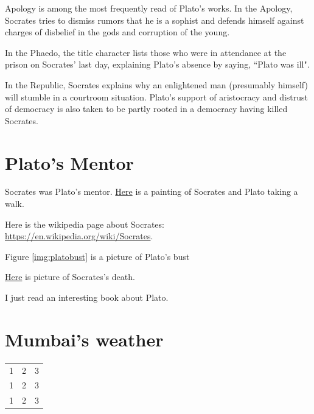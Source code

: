 \documentclass[11pt]{article}
\begin{document}
			\begin{description}[align=left]
				\item[Apology] Apology is among the most frequently read of Plato's works. In the Apology, Socrates tries to dismiss rumors that he is a sophist and defends himself against charges of disbelief in the gods and corruption of the young.
				\item[Phaedo] In the Phaedo, the title character lists those who were in attendance at the prison on Socrates' last day, explaining Plato's absence by saying, ``Plato was ill".
				\item[Republic] In the Republic, Socrates explains why an enlightened man (presumably himself) will stumble in a courtroom situation. Plato's support of aristocracy and distrust of democracy is also taken to be partly rooted in a democracy having killed Socrates.
			\end{description}

	\section{Plato's Mentor}
		Socrates was Plato's mentor. \href{https://classicalwisdom.com/wp-content/uploads/2012/12/plato-socrates.jpg}{Here} is a painting of Socrates and Plato taking a walk.

		Here is the wikipedia page about Socrates: \url{https://en.wikipedia.org/wiki/Socrates}.

		Figure \ref{img:platobust} is a picture of Plato's bust

		\href{run:./images/death_of_socrates.jpg}{Here} is picture of Socrates's death.

		I just read an interesting book\cite{finley1977aspects} about Plato.

	\section{Mumbai's weather}
		\begin{tabular}{c c c}
			1 & 2 & 3 \\
			1 & 2 & 3 \\
			1 & 2 & 3 \\
		\end{tabular}
		
\end{document}
